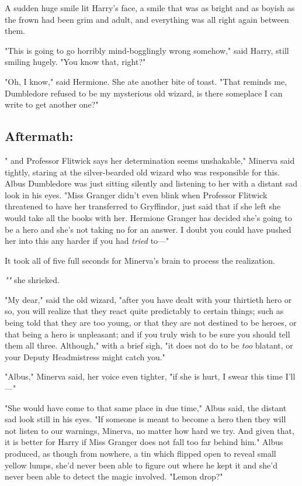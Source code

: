 A sudden huge smile lit Harry's face, a smile that was as bright and as boyish
as the frown had been grim and adult, and everything was all right again
between them.

"This is going to go horribly mind-bogglingly wrong somehow," said Harry, still
smiling hugely. "You know that, right?"

"Oh, I know," said Hermione. She ate another bite of toast. "That reminds me,
Dumbledore refused to be my mysterious old wizard, is there someplace I can
write to get another one?"
\sbreak
\subsection{Aftermath:}

"{\el} and Professor Flitwick says her determination seems unshakable,"
Minerva said tightly, staring at the silver-bearded old wizard who was
responsible for this. Albus Dumbledore was just sitting silently and listening
to her with a distant sad look in his eyes. "Miss Granger didn't even blink
when Professor Flitwick threatened to have her transferred to Gryffindor, just
said that if she left she would take all the books with her. Hermione Granger
has decided she's going to be a hero and she's not taking no for an answer. I
doubt you could have pushed her into this any harder if you had \emph{tried}
to\mbox{---}"

It took all of five full seconds for Minerva's brain to process the realization.

\emph{""} she shrieked.

"My dear," said the old wizard, "after you have dealt with your thirtieth hero
or so, you will realize that they react quite predictably to certain things;
such as being told that they are too young, or that they are not destined to be
heroes, or that being a hero is unpleasant; and if you truly wish to be sure
you should tell them all three. Although," with a brief sigh, "it does not do
to be \emph{too} blatant, or your Deputy Headmistress might catch you."

"Albus," Minerva said, her voice even tighter, "if she is hurt, I swear this
time I'll\mbox{---}"

"She would have come to that same place in due time," Albus said, the distant
sad look still in his eyes. "If someone is meant to become a hero then they
will not listen to our warnings, Minerva, no matter how hard we try. And given
that, it is better for Harry if Miss Granger does not fall too far behind him."
Albus produced, as though from nowhere, a tin which flipped open to reveal
small yellow lumps, she'd never been able to figure out where he kept it and
she'd never been able to detect the magic involved. "Lemon drop?"

